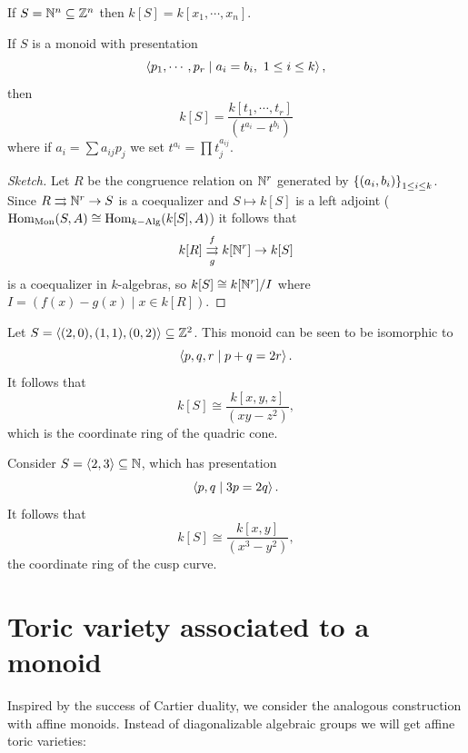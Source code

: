 \begin{example}
If $S=\mathbb{N}^n\subseteq \mathbb{Z}^n$ then $k[S]=k[x_1,\cdots, x_n]$.
\end{example}


\begin{proposition}
If $S$ is a monoid with presentation 
\[\left\langle {p_1,\cdots, p_r\mid a_i=b_i,\ 1\leq i\leq k}\right\rangle,\] 
then
\[k[S]=\frac{k[t_1,\cdots, t_r]}{(t^{a_i}-t^{b_i})}\]
where if $a_i=\sum a_{ij}p_j$ we set $t^{a_i}=\prod t_j^{a_{ij}}$.
\end{proposition}
\begin{proof}[Sketch]
Let $R$ be the congruence relation on $\mathbb{N}^r$ generated by $\left\{{(a_i,b_i)}\right\}_{1\leq i\leq k}$. Since $R\rightrightarrows \mathbb{N}^r\to S$ is a coequalizer and $S\mapsto k[S]$ is a left adjoint ($\operatorname{Hom}_{\text{Mon}}(S,A)\cong \operatorname{Hom}_{k-\text{Alg}}(k[S],A)$) it follows that
\[k[R]\overset f{\underset g\rightrightarrows} k[\mathbb{N}^r]\to k[S]\] 
is a coequalizer in $k$-algebras, so $k[S]\cong k[\mathbb{N}^r]/I$ where $I=(f(x)-g(x)\mid x\in k[R])$.
\end{proof}



\begin{example}
Let $S=\left\langle {(2,0),(1,1),(0,2)}\right\rangle\subseteq \mathbb{Z}^2$. This monoid can be seen to be isomorphic to
\[\left\langle {p,q,r\mid p+q=2r}\right\rangle.\]
It follows that
\[k[S]\cong\frac{k[x,y,z]}{(xy-z^2)},\]
which is the coordinate ring of the quadric cone.
\end{example}

\begin{example}
Consider $S=\left\langle {2,3}\right\rangle\subseteq \mathbb{N}$, which has presentation
\[\left\langle {p,q\mid 3p=2q}\right\rangle.\]
It follows that
\[k[S]\cong \frac{k[x,y]}{(x^3-y^2)},\]
the coordinate ring of the cusp curve.
\end{example}


\section{Toric variety associated to a monoid}
Inspired by the success of Cartier duality, we consider the analogous construction with affine monoids. Instead of diagonalizable algebraic groups we will get affine toric varieties:

